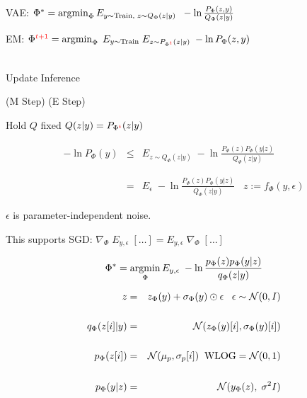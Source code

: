 {\vfill
VAE: $\Phi^* = \operatorname*{argmin}_\Phi E_{y\sim \mathrm{Train},\;z \sim Q_\Phi(z|y)}\;\;- \ln \frac{P_\Phi(z,y)}{Q_\Phi(z|y)}$

\vfill
EM: $\Phi^{\color{red} t+1} =  \operatorname*{argmin}_\Phi\;E_{y \sim \mathrm{Train}}\;E_{z \sim P_{\Phi^{\color{red} t}}(z|y)}\; - \ln P_\Phi(z,y)$ \\
\\
\centerline{\hspace{1em} Update \hspace{6em} Inference \hspace{2.5em}~}
\centerline{(M Step) \hspace{5em} (E Step) \hspace{1.5em}~}
\centerline{Hold $Q$ fixed \hspace{2.5em} $Q(z|y) = P_{\Phi^{\color{red} t}}(z|y)$ \hspace{0em}~}


\begin{eqnarray*}
- \ln P_\Phi(y) & \leq & E_{z \sim Q_\Phi(z|y)}\;-\ln \frac{P_\Phi(z)P_\Phi(y|z)}{Q_\Phi(z|y)} \\
\\
\\
& = & E_\epsilon\;-\ln \frac{P_\Phi(z)P_\Phi(y|z)}{Q_\Phi(z|y)}\;\;\;z := f_\Phi(y,\epsilon)
\end{eqnarray*}

\vfill
$\epsilon$ is parameter-independent noise.

\vfill
This supports SGD: $\nabla_\Phi \;E_{y,\epsilon}\; [\ldots] = E_{y,\epsilon}\; \nabla_\Phi\;[\ldots]$

$$\Phi^* = \operatorname*{argmin}_\Phi E_{y,\epsilon}\;-\ln \frac{p_\Phi(z)p_\Phi(y|z)}{q_\Phi(z|y)}$$

{\color{red}
\begin{eqnarray*}
z & = & z_\Phi(y) + \sigma_\Phi(y) \odot \epsilon\;\;\;\epsilon \sim {\cal N}(0,I) \\
\\
q_\Phi(z[i]|y) & = & {\cal N}(z_\Phi(y)[i],\sigma_\Phi(y)[i]) \\
\\
p_\Phi(z[i]) & = & {\cal N}(\mu_p,\sigma_p[i]) \;\;\mbox{WLOG} = {\cal N}(0,1) \\
\\
p_\Phi(y|z) & = & {\cal N}(y_\Phi(z),\;\sigma^2I)
\end{eqnarray*}
}


}

